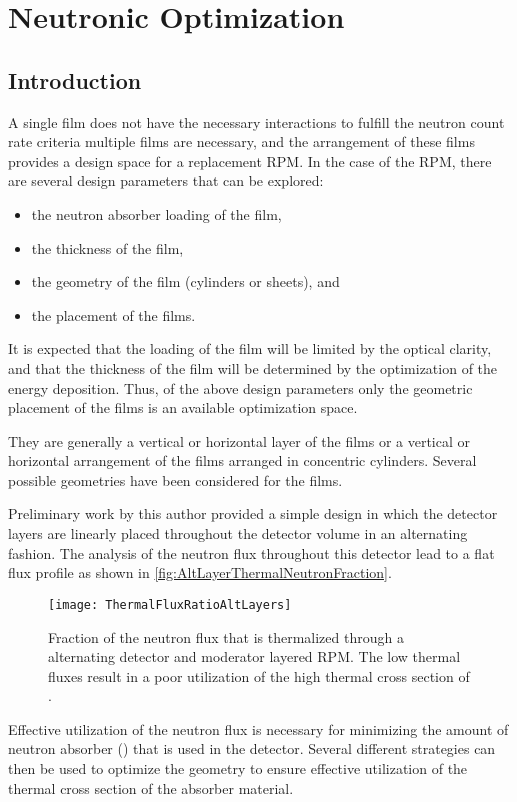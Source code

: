 \chapter{Neutronic Optimization}
\label{ch:GAOpt}
\section{Introduction}
A single film does not have the necessary interactions to fulfill the neutron count rate criteria multiple films are necessary, and the arrangement of these films provides a design space for a replacement RPM.
In the case of the RPM, there are several design parameters that can be explored:
\begin{itemize}
  \item the neutron absorber loading of the film,
  \item the thickness of the film,
  \item the geometry of the film (cylinders or sheets), and
  \item the placement of the films.
\end{itemize}
It is expected that the loading of the film will be limited by the optical clarity, and that the thickness of the film will be determined by the optimization of the energy deposition.
Thus, of the above design parameters only the geometric placement of the films is an available optimization space.

They are generally a vertical or horizontal layer of the films or a vertical or horizontal arrangement of the films arranged in concentric cylinders.
Several possible geometries have been considered for the films. 

Preliminary work by this author provided a simple design in which the detector layers are linearly placed throughout the detector volume in an alternating fashion.
The analysis of the neutron flux throughout this detector lead to a flat flux profile as shown in \autoref{fig:AltLayerThermalNeutronFraction}.
\begin{figure}
  \texttt{[image: ThermalFluxRatioAltLayers]}
	\caption{Fraction of the neutron flux that is thermalized through a alternating detector and moderator layered RPM.  The low thermal fluxes result in a poor utilization of the high thermal cross section of .}
	\label{fig:AltLayerThermalNeutronFraction}
\end{figure}
Effective utilization of the neutron flux is necessary for minimizing the amount of neutron absorber () that is used in the detector.
Several different strategies can then be used to optimize the geometry to ensure effective utilization of the thermal cross section of the absorber material.


